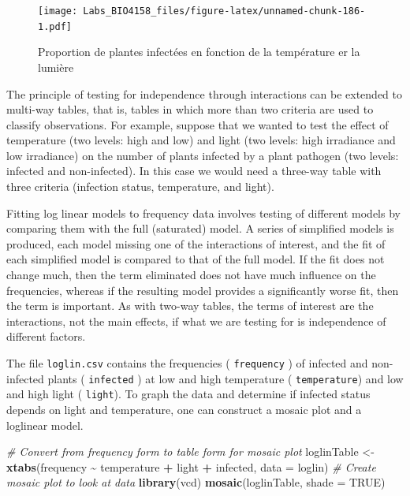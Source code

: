 \documentclass[
  12pt,
]{book}
\newenvironment{Shaded}{\begin{snugshade}}{\end{snugshade}}
\newcommand{\CommentTok}[1]{\textcolor[rgb]{0.56,0.35,0.01}{\textit{#1}}}
\newcommand{\DataTypeTok}[1]{\textcolor[rgb]{0.13,0.29,0.53}{#1}}
\newcommand{\KeywordTok}[1]{\textcolor[rgb]{0.13,0.29,0.53}{\textbf{#1}}}
\newcommand{\NormalTok}[1]{#1}
\newcommand{\OperatorTok}[1]{\textcolor[rgb]{0.81,0.36,0.00}{\textbf{#1}}}
\newcommand{\OtherTok}[1]{\textcolor[rgb]{0.56,0.35,0.01}{#1}}
\newcommand{\StringTok}[1]{\textcolor[rgb]{0.31,0.60,0.02}{#1}}
\begin{document}
\begin{figure}
\centering
\texttt{[image: Labs\_BIO4158\_files/figure-latex/unnamed-chunk-186-1.pdf]}
\caption{\label{fig:unnamed-chunk-186}Proportion de plantes infectées en fonction de la température er la lumière}
\end{figure}

The principle of testing for independence through interactions can be extended to multi-way tables, that is, tables in which more than two criteria are used to classify observations. For example, suppose that we wanted to test the effect of temperature (two levels: high and low) and light (two levels: high irradiance and low irradiance) on the number of plants infected by a plant pathogen (two levels: infected and non-infected). In this case we would need a three-way table with three criteria (infection status, temperature, and light).

Fitting log linear models to frequency data involves testing of different models by comparing them with the full (saturated) model. A series of simplified models is produced, each model missing one of the interactions of interest, and the fit of each simplified model is compared to that of the full model. If the fit does not change much, then the term eliminated does not have much influence on the frequencies, whereas if the resulting model provides a significantly worse fit, then the term is important. As with two-way tables, the terms of interest are the interactions, not the main effects, if what we are testing for is independence of different factors.

The file \texttt{loglin.csv} contains the frequencies ( \texttt{frequency} ) of infected and non-infected plants ( \texttt{infected} ) at low and high temperature ( \texttt{temperature}) and low and high light ( \texttt{light}). To graph the data and determine if infected status depends on light and temperature, one can construct a mosaic plot and a loglinear model.

\begin{Shaded}
\begin{Highlighting}[]
\CommentTok{\# Convert from frequency form to table form for mosaic plot}
\NormalTok{loglinTable \textless{}{-}}\StringTok{ }\KeywordTok{xtabs}\NormalTok{(frequency }\OperatorTok{\textasciitilde{}}\StringTok{ }\NormalTok{temperature }\OperatorTok{+}\StringTok{ }\NormalTok{light }\OperatorTok{+}\StringTok{ }\NormalTok{infected, }\DataTypeTok{data =}\NormalTok{ loglin)}
\CommentTok{\# Create mosaic plot to look at data}
\KeywordTok{library}\NormalTok{(vcd)}
\KeywordTok{mosaic}\NormalTok{(loglinTable, }\DataTypeTok{shade =} \OtherTok{TRUE}\NormalTok{)}
\end{Highlighting}
\end{Shaded}
\end{document}
